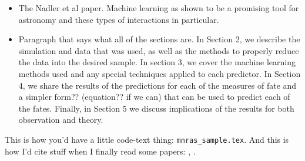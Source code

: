 \documentclass[fleqn,usenatbib]{mnras}
\begin{document}
\begin{itemize}
    \item The Nadler et al paper. Machine learning as shown to be a promising tool for astronomy and these types of interactions in particular.
  \item Paragraph that says what all of the sections are. In Section 2, we describe the simulation and data that was used, as well as the methods to properly reduce the data into the desired sample. In section 3, we cover the machine learning methods used and any special techniques applied to each predictor. In Section 4, we share the results of the predictions for each of the measures of fate and a simpler form?? (equation?? if we can) that can be used to predict each of the fates. Finally, in Section 5 we discuss implications of the results for both observation and theory.
\end{itemize}

This is how you'd have a little code-text thing: \texttt{mnras\_sample.tex}.
And this is how I'd cite stuff when I finally read some papers: \citet{Others2013}, \citep[e.g.][]{Author2012}.
\end{document}
